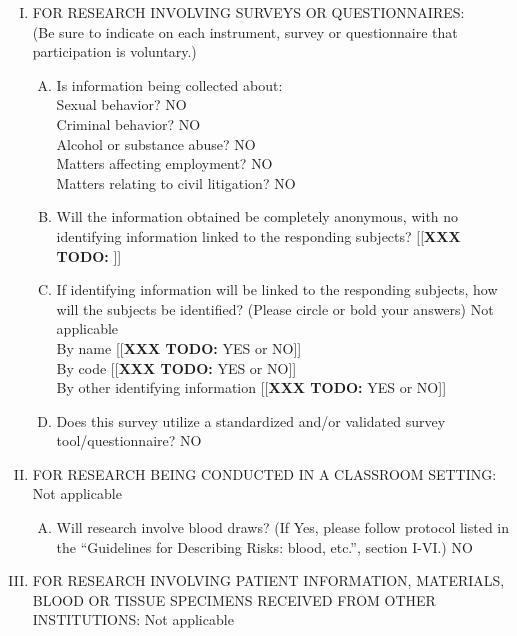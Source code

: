 \documentclass[12pt]{article}
\newcommand{\todo}[1]{{\color{red}[[\textbf{XXX TODO: }#1]]}}
\newcommand{\no}{{\color{blue}NO}\\ }
\newcommand{\na}{{\color{blue}Not applicable} }
\begin{document}
\begin{enumerate}[I.]
    \item FOR RESEARCH INVOLVING SURVEYS OR QUESTIONNAIRES:\\
            (Be sure to indicate on each instrument, survey or questionnaire
            that participation is voluntary.)
        \begin{enumerate}[A.]
                \item Is information being collected about:\\
                    Sexual behavior? \no
                    Criminal behavior? \no
                    Alcohol or substance abuse? \no
                    Matters affecting employment? \no
                    Matters relating to civil litigation? \no
                \item Will the information obtained be completely anonymous,
                    with no identifying information linked to the responding
                    subjects? \todo{}
                \item If identifying information will be linked to the
                    responding subjects, how will the subjects be identified?
                    (Please circle or bold your answers) \na \\
                    By name \todo{YES or NO}\\
                    By code \todo{YES or NO} \\
                    By other identifying information \todo{YES or NO}
                \item Does this survey utilize a standardized and/or
                    validated survey tool/questionnaire? \no
        \end{enumerate}

    \item FOR RESEARCH BEING CONDUCTED IN A CLASSROOM SETTING: \na

        \begin{enumerate}[A.]
            \item Will research involve blood draws?  (If Yes, please follow
                protocol listed in the “Guidelines for Describing Risks: blood,
                etc.”, section I-VI.) \no
        \end{enumerate}

    \item FOR RESEARCH INVOLVING PATIENT INFORMATION, MATERIALS, BLOOD OR TISSUE
            SPECIMENS RECEIVED FROM OTHER INSTITUTIONS: \na


\end{enumerate}
\end{document}
